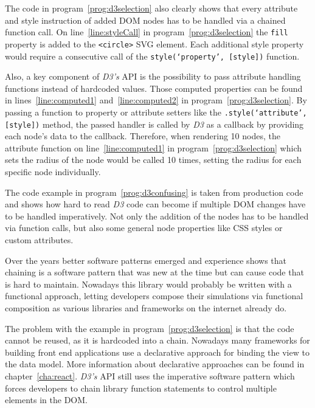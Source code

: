 The code in program~\ref{prog:d3selection} also clearly shows that every attribute and style instruction of added DOM nodes has to be handled via a chained function call. On line~\ref{line:styleCall} in program~\ref{prog:d3selection} the \texttt{fill} property is added to the \texttt{<circle>} SVG element. Each additional style property would require a consecutive call of the \texttt{style(`property', [style])} function.

Also, a key component of \emph{D3's} API is the possibility to pass attribute handling functions instead of hardcoded values. Those computed properties can be found in lines~\ref{line:computed1} and~\ref{line:computed2} in program~\ref{prog:d3selection}. By passing a function to property or attribute setters like the \texttt{.style(`attribute', [style])} method, the passed handler is called by \emph{D3} as a callback by providing each node's data to the callback. Therefore, when rendering 10 nodes, the attribute function on line~\ref{line:computed1} in program~\ref{prog:d3selection} which sets the radius of the node would be called 10 times, setting the radius for each specific node individually.

The code example in program~\ref{prog:d3confusing} is taken from production code and shows how hard to read \emph{D3} code can become if multiple DOM changes have to be handled imperatively. Not only the addition of the nodes has to be handled via function calls, but also some general node properties like CSS styles or custom attributes.

Over the years better software patterns emerged and experience shows that chaining is a software pattern that was new at the time but can cause code that is hard to maintain. Nowadays this library would probably be written with a functional approach, letting developers compose their simulations via functional composition as various libraries and frameworks on the internet already do. 

The problem with the example in program~\ref{prog:d3selection} is that the code cannot be reused, as it is hardcoded into a chain. Nowadays many frameworks for building front end applications use a declarative approach for binding the view to the data model. More information about declarative approaches can be found in chapter~\ref{cha:react}. \emph{D3's} API still uses the imperative software pattern which forces developers to chain library function statements to control multiple elements in the DOM.


